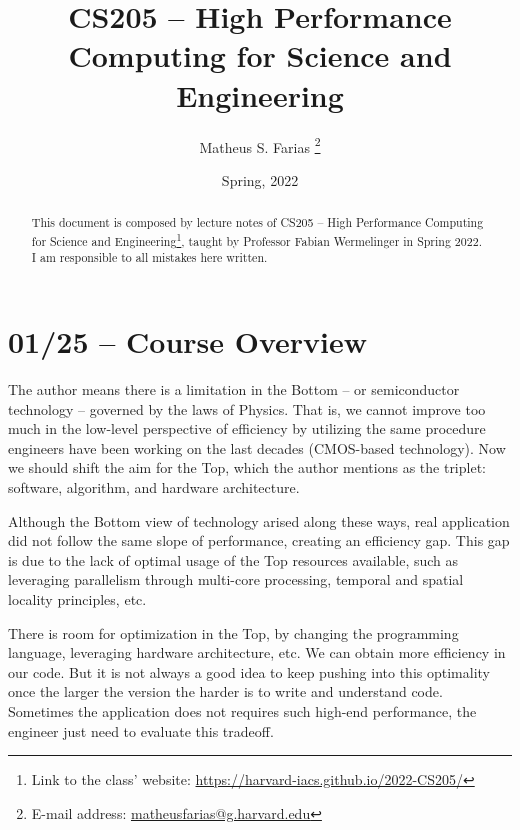\documentclass[abstract=true]{scrartcl}
\begin{document}
\title{CS205 -- High Performance Computing for Science and Engineering}
\date{Spring, 2022}

\author{Matheus S. Farias%
  \thanks{E-mail address: \href{mailto:matheusfarias@g.harvard.edu}{matheusfarias@g.harvard.edu}}}

\maketitle

\begin{abstract}
    This document is composed by lecture notes of CS205 -- High Performance Computing for Science and Engineering\footnote{Link to the class' website: \href{https://harvard-iacs.github.io/2022-CS205/}{https://harvard-iacs.github.io/2022-CS205/}}, taught by Professor Fabian Wermelinger in Spring 2022. I am responsible to all mistakes here written.
\end{abstract}

\tableofcontents

\section{01/25 -- Course Overview}

\begin{question}
    The author means there is a limitation in the Bottom -- or semiconductor technology -- governed by the laws of Physics. That is, 
    we cannot improve too much in the low-level perspective of efficiency by utilizing the same procedure engineers have been working on the last decades 
    (CMOS-based technology). Now we should shift the aim for the Top, which the author mentions as the triplet: software, algorithm, and hardware architecture.
\end{question}

\begin{question}
    Although the Bottom view of technology arised along these ways, real application did not follow the same 
    slope of performance, creating an efficiency gap. This gap is due to the lack of optimal usage of the Top resources 
    available, such as leveraging parallelism through multi-core processing, temporal and spatial locality principles, etc.
\end{question}

\begin{question}
    There is room for optimization in the Top, by changing the programming language, leveraging hardware architecture, etc. We can 
    obtain more efficiency in our code. But it is not always a good idea to keep pushing into this optimality once the larger the version 
    the harder is to write and understand code. Sometimes the application does not requires such high-end performance, the engineer just need 
    to evaluate this tradeoff.
\end{question}
\end{document}
